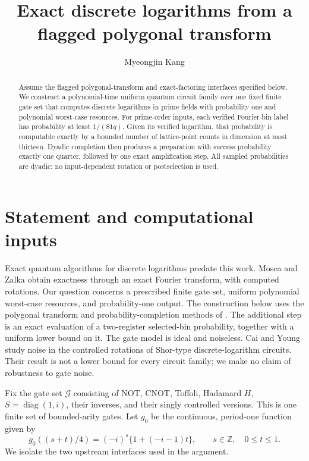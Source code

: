 \documentclass[11pt,reqno]{amsart}
\title[Exact fixed-gate discrete logarithms]{Exact discrete logarithms from a flagged polygonal transform}
\author{Myeongjin Kang}
\date{}
\numberwithin{equation}{section}
\theoremstyle{definition}
\theoremstyle{remark}
\newcommand{\Z}{\mathbb Z}
\DeclareMathOperator{\diag}{diag}
\begin{document}
\begin{abstract}
Assume the flagged polygonal-transform and exact-factoring interfaces
specified below. We construct a polynomial-time uniform quantum circuit
family over one fixed finite gate set that computes discrete logarithms
in prime fields with probability one and polynomial worst-case resources.
For prime-order inputs, each verified Fourier-bin label has probability
at least $1/(81q)$. Given its verified logarithm, that probability is
computable exactly by a bounded number of lattice-point counts in
dimension at most thirteen. Dyadic completion then produces a preparation
with success probability exactly one quarter, followed by one exact
amplification step. All sampled probabilities are dyadic; no
input-dependent rotation or postselection is used.
\end{abstract}
\maketitle

\section{Statement and computational inputs}
Exact quantum algorithms for discrete logarithms predate this work.
Mosca and Zalka \cite{MZ} obtain exactness through an exact Fourier
transform, with computed rotations. Our question concerns a prescribed
finite gate set, uniform polynomial worst-case resources, and
probability-one output. The construction below uses the polygonal
transform and probability-completion methods of \cite{OpenAI}.
The additional step is an exact evaluation of a two-register
selected-bin probability, together with a uniform lower bound on it.
The gate model is ideal and noiseless. Cai and Young \cite{CY} study
noise in the controlled rotations of Shor-type discrete-logarithm
circuits. Their result is not a lower bound for every circuit family;
we make no claim of robustness to gate noise.

Fix the gate set $\mathcal G$ consisting of NOT, CNOT, Toffoli,
Hadamard $H$, $S=\diag(1,i)$, their inverses, and their singly
controlled versions. This is one finite set of bounded-arity gates.
Let $g_0$ be the continuous, period-one function given by
\begin{equation}\label{eq:phase}
 g_0((s+t)/4)=(-i)^s\{1+(-i-1)t\},\qquad
 s\in\Z,\quad 0\le t\le1.
\end{equation}
We isolate the two upstream interfaces used in the argument.
\end{document}
